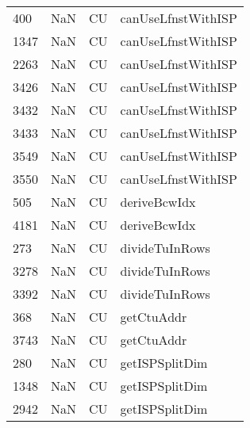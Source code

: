 \begin{tabular}{llll}
400  &                   NaN &                         CU &                        canUseLfnstWithISP \\
1347 &                   NaN &                         CU &                        canUseLfnstWithISP \\
2263 &                   NaN &                         CU &                        canUseLfnstWithISP \\
3426 &                   NaN &                         CU &                        canUseLfnstWithISP \\
3432 &                   NaN &                         CU &                        canUseLfnstWithISP \\
3433 &                   NaN &                         CU &                        canUseLfnstWithISP \\
3549 &                   NaN &                         CU &                        canUseLfnstWithISP \\
3550 &                   NaN &                         CU &                        canUseLfnstWithISP \\
505  &                   NaN &                         CU &                              deriveBcwIdx \\
4181 &                   NaN &                         CU &                              deriveBcwIdx \\
273  &                   NaN &                         CU &                            divideTuInRows \\
3278 &                   NaN &                         CU &                            divideTuInRows \\
3392 &                   NaN &                         CU &                            divideTuInRows \\
368  &                   NaN &                         CU &                                getCtuAddr \\
3743 &                   NaN &                         CU &                                getCtuAddr \\
280  &                   NaN &                         CU &                            getISPSplitDim \\
1348 &                   NaN &                         CU &                            getISPSplitDim \\
2942 &                   NaN &                         CU &                            getISPSplitDim \\

\end{tabular}
